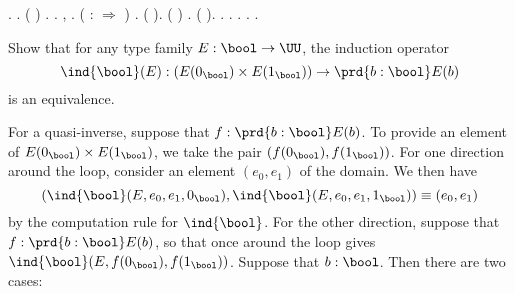 \begin{coqdoccode}
\coqdocindent{1.00em}
.\coqdoceol
\coqdocindent{2.00em}
 .  ( )  .   .  ,   .\coqdoceol
\coqdocindent{2.00em}
 ( \coqdocnotation{=}  : \ensuremath{\Rightarrow} )  .\coqdoceol
\coqdocindent{2.00em}
 (  ).\coqdoceol
\coqdocindent{2.00em}
 ( \coqdocnotation{=} )  .\coqdoceol
\coqdocindent{2.00em}
 ( ).\coqdoceol
\coqdocindent{2.00em}
  .\coqdoceol
\coqdocindent{2.00em}
 .\coqdoceol
\coqdocindent{1.00em}
.\coqdoceol
\coqdocemptyline
\coqdocnoindent
{} .\coqdoceol
\coqdocnoindent
{} .\coqdoceol
\coqdocemptyline
\end{coqdoccode}
Show that for any type family $E : \bool \to \UU$, the induction operator
\[
  \ind{\bool}(E) : 
  (E(0_{\bool}) \times E(1_{\bool}))
  \to
  \prd{b : \bool} E(b)
\]
is an equivalence.


 \soln
For a quasi-inverse, suppose that $f : \prd{b:\bool} E(b)$.  To provide an
element of $E(0_{\bool}) \times E(1_{\bool})$, we take the pair $(f(0_{\bool}),
f(1_{\bool}))$.  For one direction around the loop, consider an element
$(e_{0}, e_{1})$ of the domain.  We then have
\[
  \left(
    \ind{\bool}(E, e_{0}, e_{1}, 0_{\bool}),
    \ind{\bool}(E, e_{0}, e_{1}, 1_{\bool})
  \right)
  \equiv
  ( e_{0}, e_{1} )
\]
by the computation rule for $\ind{\bool}$.  For the other direction, suppose
that $f : \prd{b:\bool} E(b)$, so that once around the loop gives
$\ind{\bool}(E, f(0_{\bool}), f(1_{\bool}))$.  Suppose that $b : \bool$.  Then
there are two cases:



